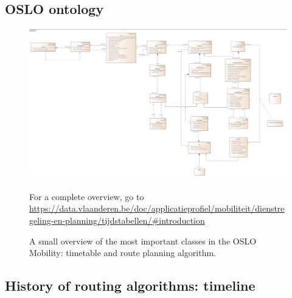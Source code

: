 \begin{appendices}

\newpage

\begin{landscape}
\section*{OSLO ontology}
\label{appendix:oslo:ontology}
    \begin{figure}[H]
    \centering
    \includegraphics[width=1.4\textwidth]{images/overview.jpg}
    \caption{A small overview of the most important classes in the OSLO Mobility: timetable and route planning algorithm. }
    \tiny For a complete overview, go to \url{https://data.vlaanderen.be/doc/applicatieprofiel/mobiliteit/dienstregeling-en-planning/tijdstabellen/#introduction}
    \label{fig:appendix:Ontology:oslo:overview}
\end{figure}
\end{landscape}

\begin{landscape}
    \section*{History of routing algorithms: timeline}
    
\end{landscape}

\end{appendices}
